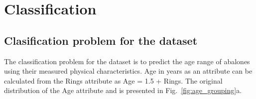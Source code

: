\documentclass[10pt, paper=a4]{article}
\begin{document}
\section{Classification}
\label{sec:classification}



\subsection{Clasification problem for the dataset}  %
The classification problem for the dataset is to predict the age range
of abalones using their measured physical characteristics.  Age in
years as an attribute can be calculated from the Rings attribute as
Age = 1.5 + Rings.  The original distribution of the Age attribute and
is presented in Fig.~\ref{fig:age_grouping}a.
\end{document}
